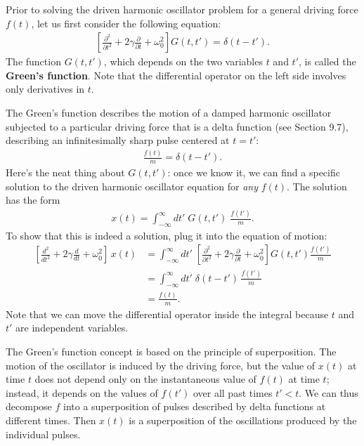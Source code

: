 \documentclass[10pt,a4paper]{article}
\begin{document}
Prior to solving the driven harmonic oscillator problem for a general
driving force $f(t)$, let us first consider the following equation:
\begin{align}
  \left[\frac{\partial^2}{\partial t^2} + 2 \gamma \frac{\partial}{\partial t} + \omega_0^2\right] G(t, t') = \delta(t-t').
  \label{eq:greenfuneq}
\end{align}
The function $G(t,t')$, which depends on the two variables $t$ and
$t'$, is called the \textbf{Green's function}.  Note that the
differential operator on the left side involves only derivatives in
$t$.

The Green's function describes the motion of a damped harmonic
oscillator subjected to a particular driving force that is a delta
function (see Section 9.7), describing an infinitesimally sharp pulse
centered at $t = t'$:
\begin{align}
  \frac{f(t)}{m} = \delta(t-t').
\end{align}
Here's the neat thing about $G(t,t')$: once we know it, we can find a
specific solution to the driven harmonic oscillator equation for
\textit{any} $f(t)$.  The solution has the form
\begin{align}
  x(t) = \int^\infty_{-\infty} dt' \; G(t,t') \; \frac{f(t')}{m}.
\end{align}
To show that this is indeed a solution, plug it into the equation of
motion:
\begin{align}
  \left[\frac{d^2}{dt^2} + 2 \gamma \frac{d}{dt} + \omega_0^2\right]\, x(t) &= \int^\infty_{-\infty} dt' \; \left[\frac{\partial^2}{\partial t^2} + 2 \gamma \frac{\partial}{\partial t} + \omega_0^2\right] G(t,t') \frac{f(t')}{m} \\
  &= \int^\infty_{-\infty} dt' \; \delta(t-t')\, \frac{f(t')}{m} \\
  &= \frac{f(t)}{m}.
\end{align}
Note that we can move the differential operator inside the integral
because $t$ and $t'$ are independent variables.

The Green's function concept is based on the principle of
superposition.  The motion of the oscillator is induced by the driving
force, but the value of $x(t)$ at time $t$ does not depend only on the
instantaneous value of $f(t)$ at time $t$; instead, it depends on the
values of $f(t')$ over all past times $t' < t$. We can thus decompose
$f$ into a superposition of pulses described by delta functions at
different times. Then $x(t)$ is a superposition of the oscillations
produced by the individual pulses.
\end{document}
